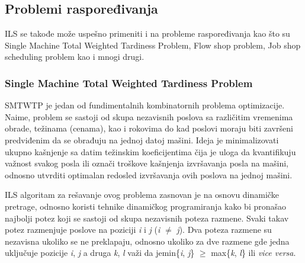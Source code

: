 \documentclass[a4paper]{article}
\begin{document}



\subsection{Problemi raspoređivanja}
ILS se takođe može uspešno primeniti i na probleme raspoređivanja kao što su Single Machine Total Weighted Tardiness Problem, Flow shop problem, Job shop scheduling problem
kao i mnogi drugi.
\subsubsection{Single Machine Total Weighted Tardiness Problem}
SMTWTP je jedan od fundimentalnih kombinatornih problema optimizacije. Naime, problem se sastoji od skupa nezavisnih poslova sa različitim vremenima obrade, težinama (cenama), kao i rokovima do kad poslovi moraju biti završeni predviđenim da se obrađuju na jednoj datoj mašini. Ideja je minimalizovati ukupno kašnjenje sa datim težinskim koeficijentima čija je uloga da kvantifikuju važnost svakog posla ili označi troškove kašnjenja izvršavanja posla na mašini, odnosno utvrditi optimalan redosled izvršavanja ovih poslova na jednoj mašini.


ILS algoritam za rešavanje ovog problema zasnovan je na osnovu dinamičke pretrage, odnosno koristi tehnike dinamičkog programiranja kako bi pronašao najbolji potez koji se sastoji od skupa nezavisnih poteza razmene. Svaki takav potez razmenjuje poslove na poziciji \textit{i} i \textit{j} (\textit{i} $\ne$ \textit{j}). Dva poteza razmene su nezavisna ukoliko se ne preklapaju, odnosno ukoliko za dve razmene gde jedna uključuje pozicije \textit{i}, \textit{j} a druga \textit{k}, \textit{l} važi da je\linebreak min\{\textit{i}, \textit{j}\} $\geq$ max\{\textit{k}, \textit{l}\} ili \textit{vice versa}.
\end{document}
